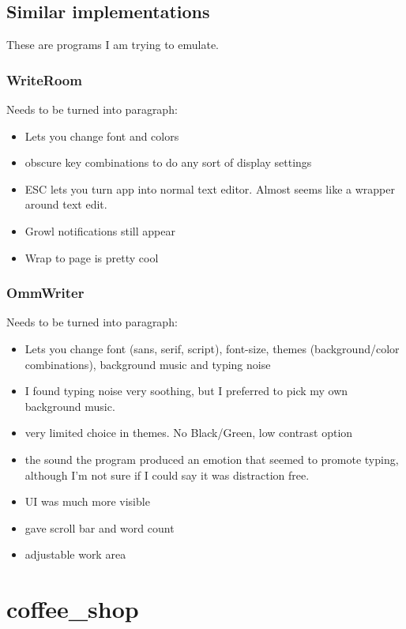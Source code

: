 \documentclass[11pt]{article}
\begin{document}
\subsection{Similar implementations}

These are programs I am trying to emulate.

\subsubsection{WriteRoom}

Needs to be turned into paragraph:

\begin{itemize}
\item Lets you change font and colors
\item obscure key combinations to do any sort of display settings
\item ESC lets you turn app into normal text editor. Almost seems like a wrapper around text edit.
\item Growl notifications still appear
\item Wrap to page is pretty cool
\end{itemize}

\subsubsection{OmmWriter}

Needs to be turned into paragraph:

\begin{itemize}
\item Lets you change font (sans, serif, script), font-size, themes (background/color combinations), background music and typing noise
\item I found typing noise very soothing, but I preferred to pick my own background music.
\item very limited choice in themes. No Black/Green, low contrast option
\item the sound the program produced an emotion that seemed to promote typing, although I'm not sure if I could say it was distraction free.
\item UI was much more visible
\item gave scroll bar and word count
\item adjustable work area
\end{itemize}

\section{coffee\_shop}
\end{document}
